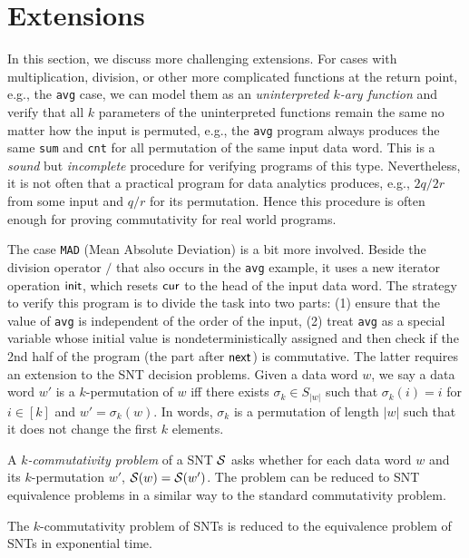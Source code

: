 \section{Extensions}
\label{sec:cases}



In this section, we discuss more challenging extensions. 
For cases with multiplication, division, or other more complicated functions at the return point, e.g., the \texttt{avg} case, we can model them as an \emph{uninterpreted $k$-ary function} and verify that all $k$ parameters of the uninterpreted functions remain the same no matter how the input is permuted, e.g., the \texttt{avg} program always produces the same \texttt{sum} and \texttt{cnt} for all permutation of the same input data word. This is a \emph{sound} but \emph{incomplete} procedure for verifying programs of this type. Nevertheless, it is not often that a  practical program for data analytics produces, e.g., $2q/2r$ from some input and $q/r$ for its permutation. Hence this procedure is often enough for proving commutativity for real world programs.

The case \texttt{MAD} (Mean Absolute Deviation) is a bit more involved. Beside the division operator $/$ that also occurs in the \texttt{avg} example, it uses a new iterator operation $\mathsf{init}$, which resets $\mathsf{cur}$ to the head of the input data word. The strategy to verify this program is to divide the task into two parts: (1) ensure that the value of \texttt{avg} is independent of the order of the input, (2) treat \texttt{avg} as a special variable whose initial value is nondeterministically assigned and then check if the 2nd half of the program (the part after $\mathsf{next}$) is commutative. The latter requires an extension to the SNT decision problems. Given a data word $w$, we say a data word $w'$ is a $k$-permutation of $w$ iff there exists $\sigma_k\in S_{|w|}$ such that $\sigma_k(i)=i$ for $i \in [k]$ and $w'=\sigma_k(w)$. In words, $\sigma_k$ is a permutation of length $|w|$ such that it does not change the first $k$ elements. 


 A \emph{$k$-commutativity problem} of a SNT ${\mathcal{S} }$ asks whether for each data word $w$ and its $k$-permutation $w'$, ${\mathcal{S} }(w)={\mathcal{S} }(w')$. The problem can be reduced to SNT equivalence problems in a similar way to the standard commutativity problem.

\begin{proposition}\label{prop-snt-kcmm-to-eqv}
	The $k$-commutativity problem of SNTs is reduced to the equivalence problem of SNTs in exponential time. 
\end{proposition}



